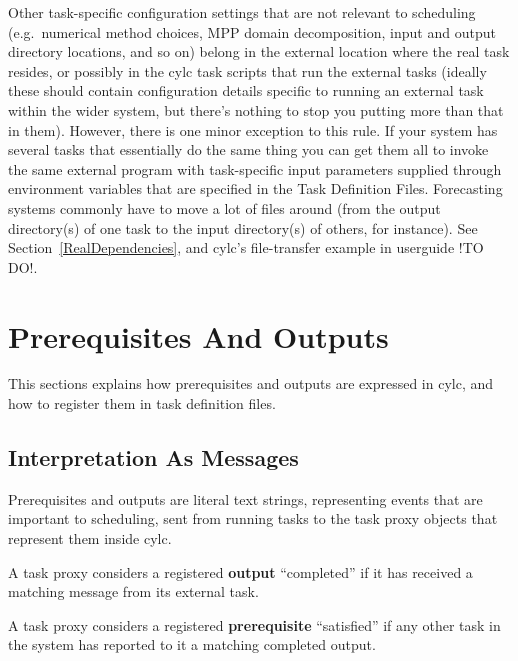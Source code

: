 \documentclass[11pt,a4paper]{article}
\begin{document}
Other task-specific configuration settings that are not relevant to
scheduling (e.g.\ numerical method choices, MPP
domain decomposition, input and output directory locations, and so on)
belong in the external location where the real task resides, or possibly
in the cylc task scripts that run the external tasks (ideally these
should contain configuration details specific to running an external
task within the wider system, but there's nothing to stop you putting
more than that in them). However, there is one minor exception to this
rule. If your system has several tasks that essentially do the same
thing you can get them all to invoke the same external program with
task-specific input parameters supplied through environment variables
that are specified in the Task Definition Files. Forecasting systems
commonly have to move a lot of files around (from the output
directory(s) of one task to the input directory(s) of others, for
instance). See Section~\ref{RealDependencies}, and cylc's file-transfer
example in userguide !TO DO!. 

\section{Prerequisites And Outputs}
\label{PrerequistiesAndOutputs}


This sections explains how prerequisites and outputs are expressed in
cylc, and how to register them in task definition files.

\subsection{Interpretation As Messages} 

\begin{shaded}
    Prerequisites and outputs are literal text strings, representing
    events that are important to scheduling, sent from running tasks
    to the  task proxy objects that represent them inside cylc.
\end{shaded}

A task proxy considers a registered {\bf output} ``completed'' if it has
received a matching message from its external task.

A task proxy considers a registered {\bf prerequisite} ``satisfied'' if
any other task in the system has reported to it a matching completed
output.
\end{document}

